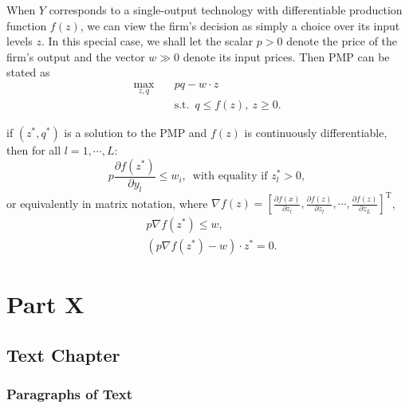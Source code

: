 \documentclass[12pt,fleqn]{book} %
\begin{document}
When $Y$ corresponds to a single-output technology with differentiable production function $f(z)$, we can view the firm's decision as simply a choice over its input levels $z$. In this special case, we shall let the scalar $p > 0$ denote the price of the firm's output and the vector $w \gg0$ denote its input prices. Then PMP can be stated as
\begin{align*}
\max_{z,q} \quad &  pq-w\cdot z\\
& \mathrm{s.t.}\ \; q\le f(z), \ z\ge 0.
\end{align*}


\begin{theorem}
	if $(z^*,q^*)$ is a solution to the PMP and $f(z)$ is continuously differentiable, then for all $l = 1,\cdots, L$:
	\[
	p\frac{\partial f(z^*)}{\partial y_l}\le w_i,\ \;\text{with equality if } z^*_l > 0,
	\]
	or equivalently in matrix notation, where $\nabla f(z)= \left[\frac{\partial f(x)}{\partial z_l},\frac{\partial f(z)}{\partial z_l},\cdots,\frac{\partial f(z)}{\partial z_L} \right]^\mathrm{T}$,
	\begin{align*}
	& p\nabla f(z^*)\le w, \\
	&(p\nabla f(z^*)- w)\cdot z^*= 0.
	\end{align*}
	
\end{theorem}




\part{Part X}



\chapter{Text Chapter}

\section{Paragraphs of Text}

\lipsum[1-7] %

\end{document}
